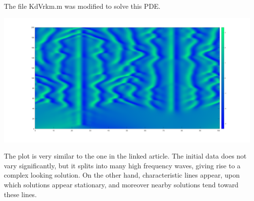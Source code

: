 \documentclass{article}
\begin{document}
The file KdVrkm.m was modified to solve this PDE.
\begin{center}
	\includegraphics[scale=.3]{hw13 q4 plot}
\end{center}
The plot is very similar to the one in the linked article. The initial data does not vary significantly, but it splits into many high frequency waves, giving rise to a complex looking solution. On the other hand, characteristic lines appear, upon which solutions appear stationary, and moreover nearby solutions tend toward these lines. 
	
\end{document}
